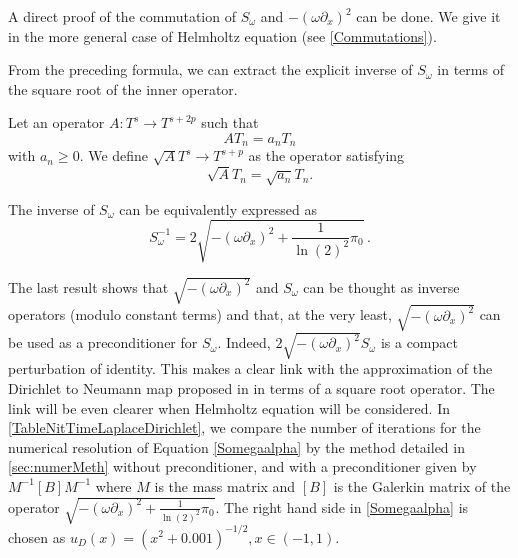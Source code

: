 \documentclass[a4paper]{article}
\begin{document}
	\begin{Rem} A direct proof of the commutation of $S_\omega$ and $-(\omega\partial_x)^2$ can be done. We give it in the 
		more general case of Helmholtz equation (see \autoref{Commutations}).
	\end{Rem}	
	From the preceding formula, we can extract the explicit inverse of $S_\omega$ in terms of the square root of the inner operator.
	\begin{Def}
		Let an operator $A : T^s \to T^{s + 2p}$ such that 
		\[AT_n = a_n T_n\]
		with $a_n \geq 0$. We define $\sqrt{A} T^s \to T^{s + p}$ as the operator satisfying 
		\[\sqrt{A}T_n = \sqrt{a_n} T_n.\]
	\end{Def}
	
	\begin{Cor}
		The inverse of $S_\omega$ can be equivalently expressed as 
		\begin{equation}
		S_{\omega}^{-1} = 2\sqrt{-(\omega \partial_x)^2 + \frac{1}{\ln(2)^2}\pi_0}\,.
		\end{equation}
	\end{Cor}
	
	The last result shows that $\sqrt{-(\omega \partial_x)^2}$ and $S_\omega$ can be thought as inverse operators (modulo constant terms) and that, at the very least, $\sqrt{-(\omega \partial_x)^2}$ can be used as a preconditioner for $S_\omega$. Indeed, $2\sqrt{-(\omega \partial_x)^2}S_\omega$ is a compact perturbation of identity. This makes a clear link with the approximation of the Dirichlet to Neumann map proposed in \cite{antoine2007generalized} in terms of a square root operator. The link will be even clearer when Helmholtz equation will be considered. In \autoref{TableNitTimeLaplaceDirichlet}, we compare the number of iterations for the numerical resolution of Equation \eqref{Somegaalpha} by the method detailed in \autoref{sec:numerMeth} without preconditioner, and with a preconditioner given by $M^{-1} \left[B \right] M^{-1}$ where $M$ is the mass matrix and $\left[ B \right]$ is the Galerkin matrix of the operator $\sqrt{ -(\omega \partial_x)^2 + \frac{1}{\ln(2)^2} \pi_0}$. The right hand side in \eqref{Somegaalpha} is chosen as $u_D(x) = (x^2 + 0.001)^{-1/2}, x \in (-1,1)$.
		
\end{document}
